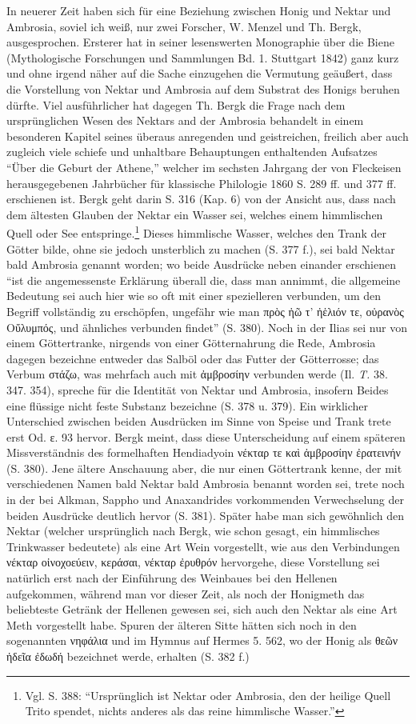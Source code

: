 \documentclass[a4paper, 11pt, oneside]{article}
\begin{document}
In neuerer Zeit haben sich für eine Beziehung zwischen Honig und Nektar und Ambrosia, soviel ich weiß, nur zwei Forscher, W. Menzel und Th. Bergk, ausgesprochen. Ersterer hat in seiner lesenswerten Monographie über die Biene (Mythologische Forschungen und Sammlungen Bd. 1. Stuttgart 1842) ganz kurz und ohne irgend näher auf die Sache einzugehen die Vermutung geäußert, dass die Vorstellung von Nektar und Ambrosia auf dem Substrat des Honigs beruhen dürfte. Viel ausführlicher hat dagegen Th. Bergk die Frage nach dem ursprünglichen Wesen des Nektars and der Ambrosia behandelt in einem besonderen Kapitel seines überaus anregenden und geistreichen, freilich aber auch zugleich viele schiefe und unhaltbare Behauptungen enthaltenden Aufsatzes "`Über die Geburt der Athene,"' welcher im sechsten Jahrgang der von Fleckeisen herausgegebenen Jahrbücher für klassische Philologie 1860 S. 289 ff. und 377 ff. erschienen ist. Bergk geht darin S. 316 (Kap. 6) von der Ansicht aus, dass nach dem ältesten Glauben der Nektar ein Wasser sei, welches einem himmlischen Quell oder See entspringe.\footnote{Vgl. S. 388: "`Ursprünglich ist Nektar oder Ambrosia, den der heilige Quell Trito spendet, nichts anderes als das reine himmlische Wasser."'} Dieses himmlische Wasser, welches den Trank der Götter bilde, ohne sie jedoch unsterblich zu machen (S. 377 f.), sei bald Nektar bald Ambrosia genannt worden; wo beide Ausdrücke neben einander erschienen "`ist die angemessenste Erklärung überall die, dass man annimmt, die allgemeine Bedeutung sei auch hier wie so oft mit einer spezielleren verbunden, um den Begriff vollständig zu erschöpfen, ungefähr wie man πρὸς ἠῶ τ' ἠἑλιόν τε, οὐρανὸς Οὔλυμπός, und ähnliches verbunden findet"' (S. 380). Noch in der Ilias sei nur von einem Göttertranke, nirgends von einer Götternahrung die Rede, Ambrosia dagegen bezeichne entweder das Salböl oder das Futter der Götterrosse; das Verbum στάζω, was mehrfach auch mit ἀμβροσίην verbunden werde (Il. \emph{T.} 38. 347. 354), spreche für die Identität von Nektar und Ambrosia, insofern Beides eine flüssige nicht feste Substanz bezeichne (S. 378 u. 379). Ein wirklicher Unterschied zwischen beiden Ausdrücken im Sinne von Speise und Trank trete erst Od. ε. 93 hervor. Bergk meint, dass diese Unterscheidung auf einem späteren Missverständnis des formelhaften Hendiadyoin νέκταρ τε καὶ ἀμβροσίην ἐρατεινήν (S. 380). Jene ältere Anschauung aber, die nur einen Göttertrank kenne, der mit verschiedenen Namen bald Nektar bald Ambrosia benannt worden sei, trete noch in der bei Alkman, Sappho und Anaxandrides vorkommenden Verwechselung der beiden Ausdrücke deutlich hervor (S. 381). Später habe man sich gewöhnlich den Nektar (welcher ursprünglich nach Bergk, wie schon gesagt, ein himmlisches Trinkwasser bedeutete) als eine Art Wein vorgestellt, wie aus den Verbindungen νέκταρ οἰνοχοεύειν, κεράσαι, νέκταρ ἐρυθρόν hervorgehe, diese Vorstellung sei natürlich erst nach der Einführung des Weinbaues bei den Hellenen aufgekommen, während man vor dieser Zeit, als noch der Honigmeth das beliebteste Getränk der Hellenen gewesen sei, sich auch den Nektar als eine Art Meth vorgestellt habe. Spuren der älteren Sitte hätten sich noch in den sogenannten νηφάλια und im Hymnus auf Hermes 5. 562, wo der Honig als θεῶν ἡδεῖα ἐδωδή bezeichnet werde, erhalten (S. 382 f.)
\end{document}
